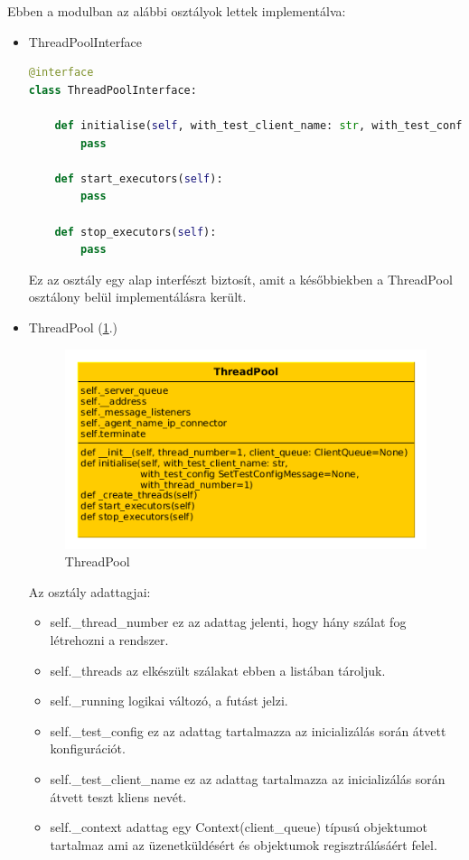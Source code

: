 \documentclass[a4paper,12pt,oneside]{report}
\begin{document}
Ebben a modulban az alábbi osztályok lettek implementálva:
\begin{itemize}
	\itemsep0em
		\item ThreadPoolInterface
		
\begin{lstlisting}[language=Python]
@interface
class ThreadPoolInterface:

    def initialise(self, with_test_client_name: str, with_test_config: SetTestConfigMessage=None, with_thread_number=1):
        pass

    def start_executors(self):
        pass

    def stop_executors(self):
        pass

\end{lstlisting}

Ez az osztály egy alap interfészt biztosít, amit a későbbiekben a ThreadPool osztálony belül implementálásra került.

		\item ThreadPool (\ref{fig:threadpool}.)
		
		\begin{figure}[h]
			  \includegraphics[width=13cm,keepaspectratio]{threadpool.png}
			  \caption{ThreadPool}
			  \label{fig:threadpool}
			\end{figure}
			
		Az osztály adattagjai:
			\begin{itemize}
				\itemsep0em
					\item self.\_thread\_number ez az adattag jelenti, hogy hány szálat fog létrehozni a rendszer.
					\item self.\_threads az elkészült szálakat ebben a listában tároljuk.
					\item self.\_running logikai változó, a futást jelzi.
					\item self.\_test\_config ez az adattag tartalmazza az inicializálás során átvett konfigurációt. 
					\item self.\_test\_client\_name ez az adattag tartalmazza az inicializálás során átvett teszt kliens nevét.
					\item self.\_context adattag egy Context(client\_queue) típusú objektumot tartalmaz ami az üzenetküldésért és objektumok regisztrálásáért felel.
			\end{itemize}


\end{itemize}
\end{document}
